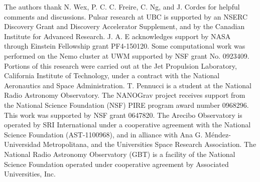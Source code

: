 \documentclass[iop,apj,tighten]{emulateapj}
\begin{document}






\acknowledgements
The authors thank N. Wex, P. C. C. Freire, C. Ng, and J. Cordes for
helpful comments and discussions.
Pulsar research at UBC is supported by an NSERC Discovery Grant and Discovery
Accelerator Supplement, and by the Canadian Institute for Advanced Research.
J. A. E acknowledges support by NASA through Einstein Fellowship grant PF4-150120. 
Some computational work was performed on the Nemo cluster at UWM supported 
by NSF grant No. 0923409. Portions of this research were carried out at the 
Jet Propulsion Laboratory, California Institute of Technology, under a contract 
with the National Aeronautics and Space Administration. 
T. Pennucci is a student at the National Radio Astronomy Observatory.
The NANOGrav project receives support from the National Science Foundation
(NSF) PIRE program award number 0968296. This work was supported by NSF grant 0647820.
The Arecibo Observatory is operated by SRI International under a cooperative
agreement with the National Science Foundation (AST-1100968), and in alliance
with Ana G. M\'{e}ndez-Universidad Metropolitana, and the Universities Space
Research Association.  The National Radio Astronomy Observatory (GBT) is a
facility of the National Science Foundation operated under cooperative
agreement by Associated Universities, Inc.
\end{document}
